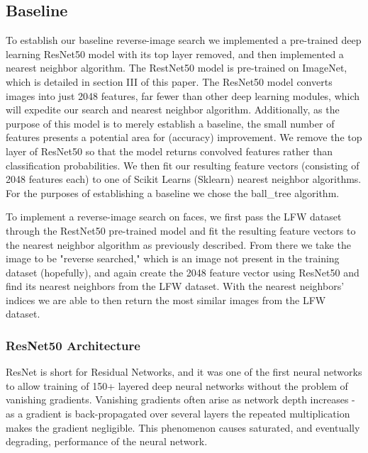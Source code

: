 \documentclass[conference]{IEEEtran}
\begin{document}
\subsection{Baseline}
To establish our baseline reverse-image search we implemented a pre-trained deep learning ResNet50 model with its top layer removed, and then implemented a nearest neighbor algorithm. The RestNet50 model is pre-trained on ImageNet, which is detailed in section III of this paper. The ResNet50 model converts images into just 2048 features, far fewer than other deep learning modules, which will expedite our search and nearest neighbor algorithm. Additionally, as the purpose of this model is to merely establish a baseline, the small number of features presents a potential area for (accuracy) improvement. We remove the top layer of ResNet50 so that the model returns convolved features rather than classification probabilities. We then fit our resulting feature vectors (consisting of 2048 features each) to one of Scikit Learns (Sklearn) nearest neighbor algorithms. For the purposes of establishing a baseline we chose the ball\_tree algorithm. 

To implement a reverse-image search on faces, we first pass the LFW dataset through the RestNet50 pre-trained model and fit the resulting feature vectors to the nearest neighbor algorithm as previously described. From there we take the image to be "reverse searched," which is an image not present in the training dataset (hopefully), and again create the 2048 feature vector using ResNet50 and find its nearest neighbors from the LFW dataset. With the nearest neighbors' indices we are able to then return the most similar images from the LFW dataset.

\subsubsection{ResNet50 Architecture}

ResNet is short for Residual Networks, and it was one of the first neural networks to allow training of 150+ layered deep neural networks without the problem of vanishing gradients. Vanishing gradients often arise as network depth increases - as a gradient is back-propagated over several layers the repeated multiplication makes the gradient negligible. This phenomenon causes saturated, and eventually degrading, performance of the neural network. 
\end{document}
